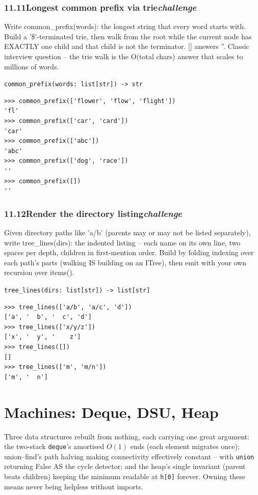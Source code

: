 \documentclass[10pt,letterpaper]{book}
\begin{document}
\subsection*{11.11\quad Longest common prefix via trie\hfill\textnormal{\textit{challenge}}}
Write common\_prefix(words): the longest string that every word starts with. Build a '\$'-terminated trie, then walk from the root while the current node has EXACTLY one child and that child is not the terminator. [] answers ''. Classic interview question -- the trie walk is the O(total chars) answer that scales to millions of words.

\noindent\texttt{common\_prefix(words: list[str]) -> str}
\begin{lstlisting}[style=ex]
>>> common_prefix(['flower', 'flow', 'flight'])
'fl'
>>> common_prefix(['car', 'card'])
'car'
>>> common_prefix(['abc'])
'abc'
>>> common_prefix(['dog', 'race'])
''
>>> common_prefix([])
''
\end{lstlisting}
\subsection*{11.12\quad Render the directory listing\hfill\textnormal{\textit{challenge}}}
Given directory paths like 'a/b' (parents may or may not be listed separately), write tree\_lines(dirs): the indented listing -- each name on its own line, two spaces per depth, children in first-mention order. Build by folding indexing over each path's parts (walking IS building on an ITree), then emit with your own recursion over items().

\noindent\texttt{tree\_lines(dirs: list[str]) -> list[str]}
\begin{lstlisting}[style=ex]
>>> tree_lines(['a/b', 'a/c', 'd'])
['a', '  b', '  c', 'd']
>>> tree_lines(['x/y/z'])
['x', '  y', '    z']
>>> tree_lines([])
[]
>>> tree_lines(['m', 'm/n'])
['m', '  n']
\end{lstlisting}
\clearpage
\chapter{Machines: Deque, DSU, Heap}

Three data structures rebuilt from nothing, each carrying one great argument:
the two-stack \texttt{deque}'s amortised $O(1)$ ends (each element migrates
once); union--find's path halving making connectivity effectively constant
-- with \texttt{union} returning False AS the cycle detector; and the heap's
single invariant (parent beats children) keeping the minimum readable at
\texttt{h[0]} forever. Owning these means never being helpless without
imports.
\end{document}
